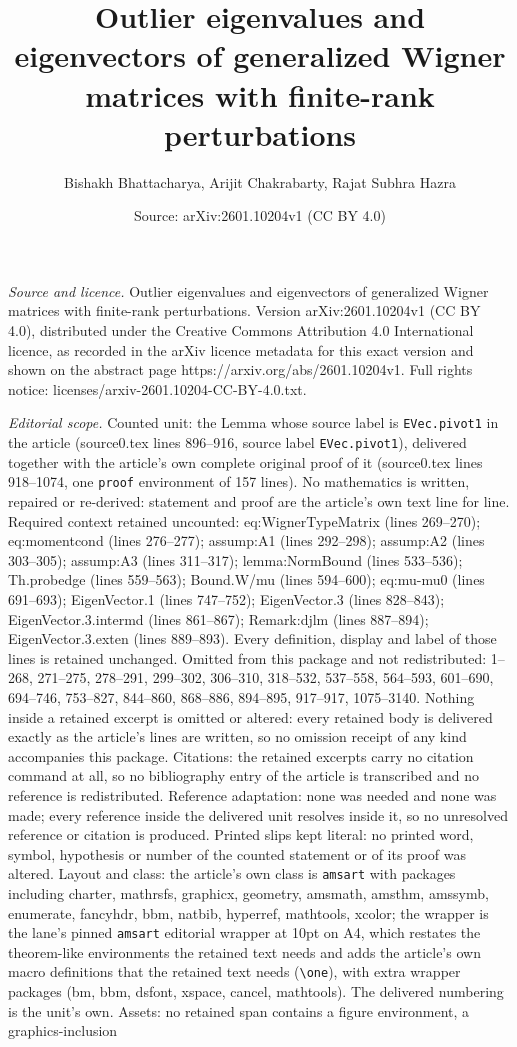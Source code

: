 \documentclass[10pt,a4paper]{amsart}
\title[Outlier eigenvalues and eigenvectors of generalized Wigner m]{Outlier eigenvalues and eigenvectors of generalized Wigner matrices with finite-rank perturbations}
\author{Bishakh Bhattacharya, Arijit Chakrabarty, Rajat Subhra Hazra}
\date{Source: arXiv:2601.10204v1 (CC BY 4.0)}
\begin{document}
\maketitle

\noindent\emph{Source and licence.} Outlier eigenvalues and eigenvectors of generalized Wigner matrices with finite-rank perturbations. Version arXiv:2601.10204v1 (CC BY 4.0), distributed under the Creative Commons Attribution 4.0 International licence, as recorded in the arXiv licence metadata for this exact version and shown on the abstract page https://arxiv.org/abs/2601.10204v1. Full rights notice: licenses/arxiv-2601.10204-CC-BY-4.0.txt.\par\smallskip

\noindent\textit{Editorial scope.} Counted unit: the Lemma whose source label is \texttt{EVec.pivot1} in the article (source0.tex lines 896--916, source label \texttt{EVec.pivot1}), delivered together with the article's own complete original proof of it (source0.tex lines 918--1074, one \texttt{proof} environment of 157 lines). No mathematics is written, repaired or re-derived: statement and proof are the article's own text line for line. Required context retained uncounted: eq:WignerTypeMatrix (lines 269--270); eq:momentcond (lines 276--277); assump:A1 (lines 292--298); assump:A2 (lines 303--305); assump:A3 (lines 311--317); lemma:NormBound (lines 533--536); Th.probedge (lines 559--563); Bound.W/mu (lines 594--600); eq:mu-mu0 (lines 691--693); EigenVector.1 (lines 747--752); EigenVector.3 (lines 828--843); EigenVector.3.intermd (lines 861--867); Remark:djlm (lines 887--894); EigenVector.3.exten (lines 889--893). Every definition, display and label of those lines is retained unchanged. Omitted from this package and not redistributed: 1--268, 271--275, 278--291, 299--302, 306--310, 318--532, 537--558, 564--593, 601--690, 694--746, 753--827, 844--860, 868--886, 894--895, 917--917, 1075--3140. Nothing inside a retained excerpt is omitted or altered: every retained body is delivered exactly as the article's lines are written, so no omission receipt of any kind accompanies this package. Citations: the retained excerpts carry no citation command at all, so no bibliography entry of the article is transcribed and no reference is redistributed. Reference adaptation: none was needed and none was made; every reference inside the delivered unit resolves inside it, so no unresolved reference or citation is produced. Printed slips kept literal: no printed word, symbol, hypothesis or number of the counted statement or of its proof was altered. Layout and class: the article's own class is \texttt{amsart} with packages including charter, mathrsfs, graphicx, geometry, amsmath, amsthm, amssymb, enumerate, fancyhdr, bbm, natbib, hyperref, mathtools, xcolor; the wrapper is the lane's pinned \texttt{amsart} editorial wrapper at 10pt on A4, which restates the theorem-like environments the retained text needs and adds the article's own macro definitions that the retained text needs (\texttt{\textbackslash one}), with extra wrapper packages (bm, bbm, dsfont, xspace, cancel, mathtools). The delivered numbering is the unit's own. Assets: no retained span contains a figure environment, a graphics-inclusion 
\end{document}
